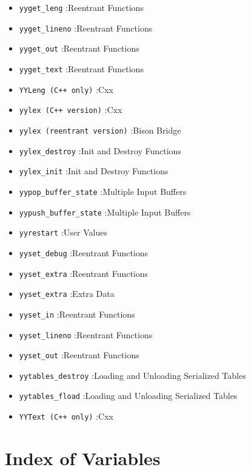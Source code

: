 \documentclass[openany,oneside]{book}
\begin{document}
\begin{itemize}
\item  \verb`yyget_leng` :Reentrant Functions
\item  \verb`yyget_lineno` :Reentrant Functions
\item  \verb`yyget_out` :Reentrant Functions
\item  \verb`yyget_text` :Reentrant Functions
\item  \verb`YYLeng (C++ only)` :Cxx
\item  \verb`yylex (C++ version)` :Cxx
\item  \verb`yylex (reentrant version)` :Bison Bridge
\item  \verb`yylex_destroy` :Init and Destroy Functions
\item  \verb`yylex_init` :Init and Destroy Functions
\item  \verb`yypop_buffer_state` :Multiple Input Buffers
\item  \verb`yypush_buffer_state` :Multiple Input Buffers
\item  \verb`yyrestart` :User Values
\item  \verb`yyset_debug` :Reentrant Functions
\item  \verb`yyset_extra` :Reentrant Functions
\item  \verb`yyset_extra` :Extra Data
\item  \verb`yyset_in` :Reentrant Functions
\item  \verb`yyset_lineno` :Reentrant Functions
\item  \verb`yyset_out` :Reentrant Functions
\item  \verb`yytables_destroy` :Loading and Unloading Serialized Tables
\item  \verb`yytables_fload` :Loading and Unloading Serialized Tables
\item  \verb`YYText (C++ only)` :Cxx
\end{itemize}

\section{Index of Variables}
\end{document}
